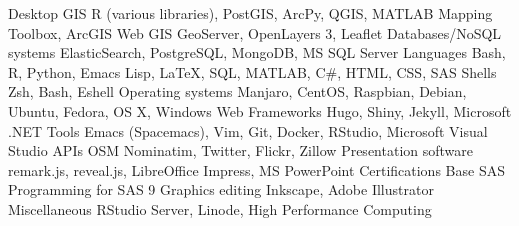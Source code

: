 \begin{cvtechskills}
    \cvtechskill    
        {Desktop GIS}
        {R (various libraries), PostGIS, ArcPy, QGIS, MATLAB Mapping Toolbox, ArcGIS}
        {}
        {}
    \cvtechskill    
        {Web GIS}
        {GeoServer, OpenLayers 3, Leaflet}
        {}
        {}
    \cvtechskill    
        {Databases/NoSQL systems}
        {ElasticSearch, PostgreSQL, MongoDB, MS SQL Server}
        {}
        {}
    \cvtechskill    
        {Languages}
        {Bash, R, Python, Emacs Lisp, LaTeX, SQL, MATLAB, C\#, HTML, CSS, SAS}
        {}
        {}
    \cvtechskill    
        {Shells}
        {Zsh, Bash, Eshell}
        {}
        {}
    \cvtechskill    
        {Operating systems}
        {Manjaro, CentOS, Raspbian, Debian, Ubuntu, Fedora, OS X, Windows}
        {}
        {}  
    \cvtechskill    
        {Web Frameworks}
        {Hugo, Shiny, Jekyll, Microsoft .NET}
        {}
        {}  
    \cvtechskill
        {Tools}
        {Emacs (Spacemacs), Vim, Git, Docker, RStudio, Microsoft Visual Studio}
        {}
        {}
    \cvtechskill    
        {APIs}
        {OSM Nominatim, Twitter, Flickr, Zillow}
        {}
        {}
    \cvtechskill    
        {Presentation software}
        {remark.js, reveal.js, LibreOffice Impress, MS PowerPoint}
        {}
        {}
    \cvtechskill
        {Certifications}
        {Base SAS Programming for SAS 9}
        {}
        {}
    \cvtechskill
        {Graphics editing}
        {Inkscape, Adobe Illustrator}
        {}
        {}
    \cvtechskill
        {Miscellaneous}
        {RStudio Server, Linode, High Performance Computing}
        {}
        {}
\end{cvtechskills}